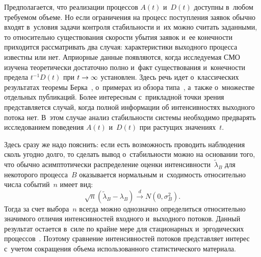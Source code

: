 \begin{multicols}{2}
     Предполагается, что реализации процессов $A(t)$ и~$D(t)$ доступны 
в~любом требуемом объеме. Но если ограничения на процесс по\-ступ\-ле\-ния заявок 
обычно входят в~условия задачи контроля стабильности и~их можно считать 
заданными, то относительно существования ско\-рости убытия заявок и~ее 
конечности приходится рас\-смат\-ри\-вать два случая: характеристики выходного 
процесса известны или нет. Априорные данные появляются, когда исследуемая 
СМО изучена тео\-ре\-ти\-че\-ски достаточно полно и~факт существования и~конечности 
предела $t^{-1} D(t)$ при $t\hm\to\infty$ установлен. Здесь речь идет 
о~классических результатах тео\-ре\-мы Берка~\cite{4-kri}, о~примерах из обзора 
типа~\cite{5-kri}, а~также о~множестве отдельных публикаций. Более интересным с~прикладной точки зрения представляется случай, когда полной информации об 
интенсивностях выходного потока нет. В~этом случае анализ ста\-биль\-ности 
сис\-те\-мы необходимо предварять исследованием поведения $A(t)$ и~$D(t)$ при 
растущих значениях~$t$. 
     
     Здесь сразу же надо пояснить: если есть возможность проводить 
наблюдения сколь угодно долго, то сделать вывод о~ста\-биль\-ности можно на 
основании того, что обычно асимптотически распределение оценки 
ин\-тен\-сив\-ности~$\tilde{\lambda}_B$ для некоторого процесса~$B$ оказывается 
нормальным и~схо\-ди\-мость относительно чис\-ла событий~$n$ имеет вид:
     $$
     \sqrt{n}\left( \tilde{\lambda}_B-\lambda_B\right) \overset{d}{\to} 
N \!\left(0,\sigma^2_B\right).
     $$
Тогда за счет выбора~$n$ всегда можно однозначно определиться относительно 
значимого отличия интенсивностей входного и~выходного потоков. Данный 
результат остается в~силе по крайне мере для стационарных и~эргодических 
процессов~\cite{6-kri}. Поэтому сравнение интенсивностей потоков пред\-став\-ля\-ет 
интерес с~учетом сокращения объема использованного статистического материала.
     

\end{multicols}
